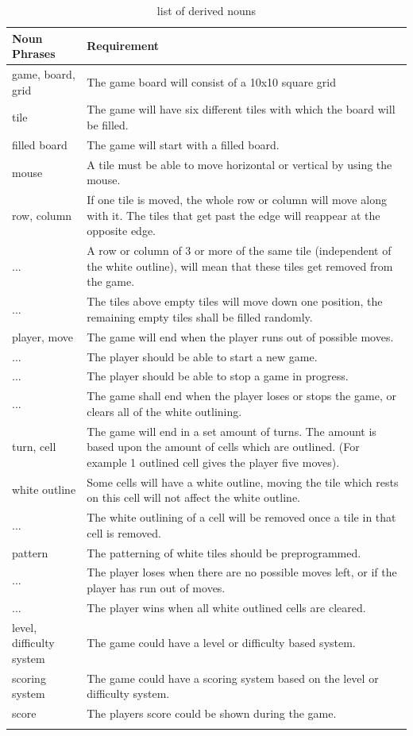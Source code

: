\documentclass{article}
\begin{document}
\begin{center}
    \begin{longtable}{ | p{1in} | p{3in} |}
    \hline
    \rowcolor{Gray}
    Noun Phrases & Requirement \\ \hline
    game, board, grid & The game board will consist of a 10x10 square grid \\ \hline
    tile & The game will have six different tiles with which the board will be filled.\\ \hline
    filled board & The game will start with a filled board.\\ \hline
    mouse & A tile must be able to move horizontal or vertical by using the mouse.\\ \hline
    row, column & If one tile is moved, the whole row or column will move along with it. The tiles that get past the edge will reappear at the opposite edge. \\ \hline
	... & A row or column of 3 or more of the same tile (independent of the white outline), will mean that these tiles get removed from the game. \\ \hline
	... & The tiles above empty tiles will move down one position, the remaining empty tiles shall be filled randomly. \\ \hline
	player, move & The game will end when the player runs out of possible moves. \\ \hline
	... & The player should be able to start a new game. \\ \hline
	... & The player should be able to stop a game in progress. \\ \hline
	... & The game shall end when the player loses or stops the game, or clears all of the white outlining. \\ \hline
	turn, cell & The game will end in a set amount of turns. The amount is based upon the amount of cells which are outlined. (For example 1 outlined cell gives the player five moves). \\ \hline
	white outline & Some cells will have a white outline, moving the tile which rests on this cell will not affect the white outline. \\ \hline
	... & The white outlining of a cell will be removed once a tile in that cell is removed. \\ \hline
	pattern & The patterning of white tiles should be preprogrammed. \\ \hline
	... & The player loses when there are no possible moves left, or if the player has run out of moves. \\ \hline
	... & The player wins when all white outlined cells are cleared. \\ \hline
	level, difficulty system & The game could have a level or difficulty based system. \\ \hline
	scoring system & The game could have a scoring system based on the level or difficulty system. \\ \hline
	score & The players score could be shown during the game. \\ \hline
	\caption{list of derived nouns}\label{table:ListDerivedNouns}
    \end{longtable}
\end{center}
\end{document}
